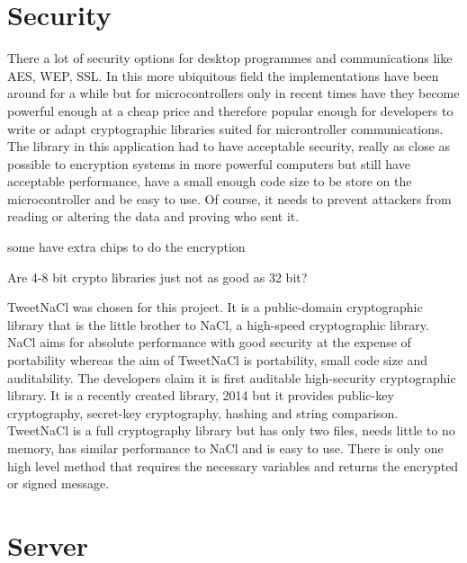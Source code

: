 \section{Security}

There a lot of security options for desktop programmes and communications like AES, WEP, SSL. In this more ubiquitous field the implementations have been around for a while but for microcontrollers only in recent times have they become powerful enough at a cheap price and therefore popular enough for developers to write or adapt cryptographic libraries suited for microntroller communications. The library in this application had to have acceptable security, really as close as possible to encryption systems in more powerful computers but still have acceptable performance, have a small enough code size to be store on the microcontroller and be easy to use. Of course, it needs to prevent attackers from reading or altering the data and proving who sent it.

some have extra chips to do the encryption

Are 4-8 bit crypto libraries just not as good as 32 bit?

TweetNaCl was chosen for this project. It is a public-domain cryptographic library that is the little brother to NaCl, a high-speed cryptographic library. NaCl aims for absolute performance with good security at the expense of portability whereas the aim of TweetNaCl is portability, small code size and auditability. The developers claim it is first auditable high-security cryptographic library. It is a recently created library, 2014 but it provides public-key cryptography, secret-key cryptography, hashing and string comparison. TweetNaCl is a full cryptography library but has only two files, needs little to no memory, has similar performance to NaCl and is easy to use. There is only one high level method that requires the necessary variables and returns the encrypted or signed message.


\section{Server}

